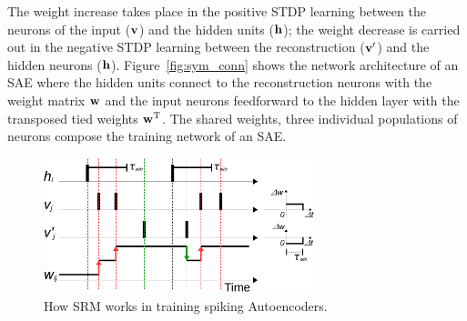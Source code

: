 The weight increase takes place in the positive STDP learning between the neurons of the input ($\bf{v}$) and the hidden units ($\bf{h}$); 
the weight decrease is carried out in the negative STDP learning between the reconstruction ($\bf{v'}$) and the hidden neurons ($\bf{h}$).
Figure~\ref{fig:sym_conn} shows the network architecture of an SAE where the hidden units connect to the reconstruction neurons with the weight matrix $\bf{w}$ and the input neurons feedforward to the hidden layer with the transposed tied weights $\bf{w}^\textrm{T}$.
The shared weights, three individual populations of neurons compose the training network of an SAE.

\begin{figure}[bh]
	\centering
	\includegraphics[width=0.7\textwidth]{pics_sdlm/rSTDP.pdf}
	\caption{How SRM works in training spiking Autoencoders.}
	\label{fig:rSTDP}
\end{figure}

